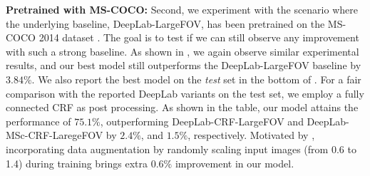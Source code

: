 \textbf{Pretrained with MS-COCO:} Second, we experiment with the scenario where the underlying baseline, DeepLab-LargeFOV, has been pretrained on the MS-COCO 2014 dataset \cite{lin2014microsoft}. The goal is to test if we can still observe any improvement with such a strong baseline. As shown in , we again observe similar experimental results, and our best model still outperforms the DeepLab-LargeFOV baseline by $3.84\%$. We also report the
best model on the {\it test} set in the bottom of . For a fair comparison with the reported DeepLab variants on the test set, we employ a fully connected CRF \cite{KrahenbuhlK11} as post processing. As shown in the table, our model attains the performance of $75.1\%$, outperforming DeepLab-CRF-LargeFOV and DeepLab-MSc-CRF-LaregeFOV by $2.4\%$, and $1.5\%$, respectively. Motivated by \cite{lin2015efficient}, incorporating data augmentation by randomly scaling input images (from 0.6 to 1.4) during training brings extra $0.6\%$ improvement in our model.


